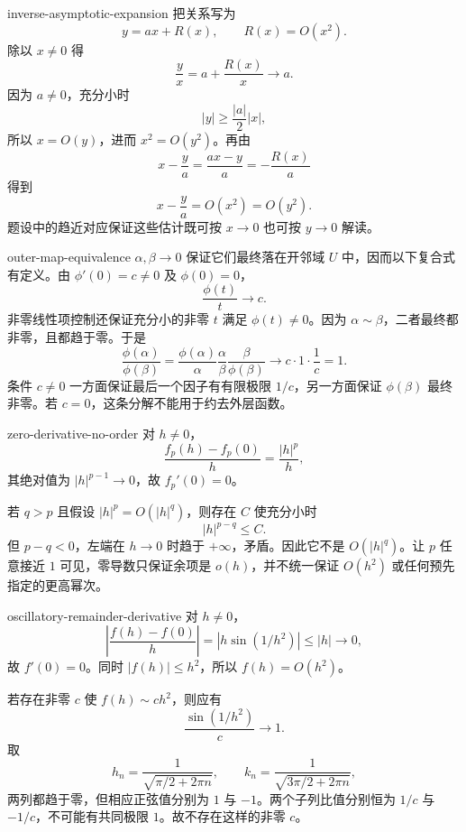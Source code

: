 \begin{solution}{inverse-asymptotic-expansion}
把关系写为
\[
 y=ax+R(x),\qquad R(x)=O(x^2).
\]
除以 \(x\ne0\) 得
\[
 \frac yx=a+\frac{R(x)}x\longrightarrow a.
\]
因为 \(a\ne0\)，充分小时
\[
 |y|\ge\frac{|a|}{2}|x|,
\]
所以 \(x=O(y)\)，进而 \(x^2=O(y^2)\)。再由
\[
 x-\frac ya=\frac{ax-y}{a}=-\frac{R(x)}a
\]
得到
\[
 x-\frac ya=O(x^2)=O(y^2).
\]
题设中的趋近对应保证这些估计既可按 \(x\to0\) 也可按 \(y\to0\) 解读。
\end{solution}

\begin{solution}{outer-map-equivalence}
\(\alpha,\beta\to0\) 保证它们最终落在开邻域 \(U\) 中，因而以下复合式有定义。由 \(\phi'(0)=c\ne0\) 及 \(\phi(0)=0\)，
\[
 \frac{\phi(t)}t\longrightarrow c.
\]
非零线性项控制还保证充分小的非零 \(t\) 满足 \(\phi(t)\ne0\)。因为 \(\alpha\sim\beta\)，二者最终都非零，且都趋于零。于是
\[
 \frac{\phi(\alpha)}{\phi(\beta)}
 =\frac{\phi(\alpha)}{\alpha}
  \frac{\alpha}{\beta}
  \frac{\beta}{\phi(\beta)}
 \longrightarrow c\cdot1\cdot\frac1c=1.
\]
条件 \(c\ne0\) 一方面保证最后一个因子有有限极限 \(1/c\)，另一方面保证 \(\phi(\beta)\) 最终非零。若 \(c=0\)，这条分解不能用于约去外层函数。
\end{solution}

\begin{solution}{zero-derivative-no-order}
对 \(h\ne0\)，
\[
 \frac{f_p(h)-f_p(0)}h
 =\frac{|h|^p}{h},
\]
其绝对值为 \(|h|^{p-1}\to0\)，故 \(f_p'(0)=0\)。

若 \(q>p\) 且假设 \(|h|^p=O(|h|^q)\)，则存在 \(C\) 使充分小时
\[
 |h|^{p-q}\le C.
\]
但 \(p-q<0\)，左端在 \(h\to0\) 时趋于 \(+\infty\)，矛盾。因此它不是 \(O(|h|^q)\)。让 \(p\) 任意接近 \(1\) 可见，零导数只保证余项是 \(o(h)\)，并不统一保证 \(O(h^2)\) 或任何预先指定的更高幂次。
\end{solution}

\begin{solution}{oscillatory-remainder-derivative}
对 \(h\ne0\)，
\[
 \left|\frac{f(h)-f(0)}h\right|
 =|h\sin(1/h^2)|\le|h|\longrightarrow0,
\]
故 \(f'(0)=0\)。同时 \(|f(h)|\le h^2\)，所以 \(f(h)=O(h^2)\)。

若存在非零 \(c\) 使 \(f(h)\sim ch^2\)，则应有
\[
 \frac{\sin(1/h^2)}c\longrightarrow1.
\]
取
\[
 h_n=\frac1{\sqrt{\pi/2+2\pi n}},\qquad
 k_n=\frac1{\sqrt{3\pi/2+2\pi n}},
\]
两列都趋于零，但相应正弦值分别为 \(1\) 与 \(-1\)。两个子列比值分别恒为 \(1/c\) 与 \(-1/c\)，不可能有共同极限 \(1\)。故不存在这样的非零 \(c\)。
\end{solution}

